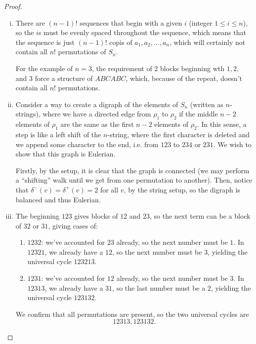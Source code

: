 \documentclass[11pt]{article}
\begin{document}
\begin{proof}
    \begin{enumerate}[(i)]
        \item There are $(n-1)!$ sequences that begin with a given $i$ (integer $1\leq i\leq n$), so the $i$s must be evenly spaced throughout the sequence, which means that the sequence is just $(n-1)!$ copis of $a_1,a_2,\dots,a_n$, which will certainly not contain all $n!$ permutations of $S_n$.
        
        For the example of $n=3$, the requirement of $2$ blocks beginning wth $1,2,$ and $3$ force a structure of $ABCABC$, which, because of the repeat, doesn't contain all $n!$ permutations. 
        \item Consider a way to create a digraph of the elements of $S_n$ (written as $n$-strings), where we have a directed edge from $\rho_1$ to $\rho_2$ if the middle $n-2$ elements of $\rho_1$ are the same as the first $n-2$ elements of $\rho_2$. In this sense, a step is like a left shift of the $n$-string, where the first character is deleted and we append some character to the end, i.e. from $123$ to $234$ or $231$. We wish to show that this graph is Eulerian. 
        
        Firstly, by the setup, it is clear that the graph is connected (we may perform a ``shifting'' walk until we get from one permutation to another). Then, notice that $\delta^-(v)=\delta^+(v)=2$ for all $v$, by the string setup, so the digraph is balanced and thus Eulerian.
        \item The beginning $123$ gives blocks of $12$ and $23$, so the next term can be a block of $32$ or $31$, giving cases of:
        \begin{enumerate}
            \item $1232$: we've accounted for $23$ already, so the next number must be $1$. In $12321$, we already have a $12$, so the next number must be $3$, yielding the universal cycle $123213$.
            \item $1231$: we've accounted for $12$ already, so the next number must be $3$. In $12313$, we already have a $31$, so the last number must be a $2$, yielding the universal cycle $123132$.
        \end{enumerate}
        We confirm that all permutations are present, so the two universal cycles are \[\boxed{12313,123132}.\]
    \end{enumerate}
\end{proof}
\end{document}

